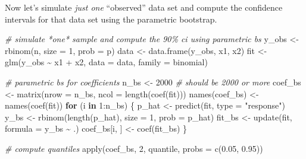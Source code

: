 \documentclass[
]{book}
\newenvironment{Shaded}{\begin{snugshade}}{\end{snugshade}}
\newcommand{\AttributeTok}[1]{\textcolor[rgb]{0.77,0.63,0.00}{#1}}
\newcommand{\CommentTok}[1]{\textcolor[rgb]{0.56,0.35,0.01}{\textit{#1}}}
\newcommand{\ControlFlowTok}[1]{\textcolor[rgb]{0.13,0.29,0.53}{\textbf{#1}}}
\newcommand{\DecValTok}[1]{\textcolor[rgb]{0.00,0.00,0.81}{#1}}
\newcommand{\FloatTok}[1]{\textcolor[rgb]{0.00,0.00,0.81}{#1}}
\newcommand{\FunctionTok}[1]{\textcolor[rgb]{0.00,0.00,0.00}{#1}}
\newcommand{\NormalTok}[1]{#1}
\newcommand{\OtherTok}[1]{\textcolor[rgb]{0.56,0.35,0.01}{#1}}
\newcommand{\SpecialCharTok}[1]{\textcolor[rgb]{0.00,0.00,0.00}{#1}}
\newcommand{\StringTok}[1]{\textcolor[rgb]{0.31,0.60,0.02}{#1}}
\begin{document}
Now let's simulate \emph{just one} ``observed'' data set and compute the confidence intervals for that data set using the parametric bootstrap.

\begin{Shaded}
\begin{Highlighting}[]
\CommentTok{\# simulate *one* sample and compute the 90\% ci using parametric bs}
\NormalTok{y\_obs }\OtherTok{\textless{}{-}} \FunctionTok{rbinom}\NormalTok{(n, }\AttributeTok{size =} \DecValTok{1}\NormalTok{, }\AttributeTok{prob =}\NormalTok{ p)}
\NormalTok{data }\OtherTok{\textless{}{-}} \FunctionTok{data.frame}\NormalTok{(y\_obs, x1, x2)}
\NormalTok{fit }\OtherTok{\textless{}{-}} \FunctionTok{glm}\NormalTok{(y\_obs }\SpecialCharTok{\textasciitilde{}}\NormalTok{ x1 }\SpecialCharTok{+}\NormalTok{ x2, }\AttributeTok{data =}\NormalTok{ data, }\AttributeTok{family =}\NormalTok{ binomial)}

\CommentTok{\# parametric bs for coefficients}
\NormalTok{n\_bs }\OtherTok{\textless{}{-}} \DecValTok{2000}  \CommentTok{\# should be 2000 or more}
\NormalTok{coef\_bs }\OtherTok{\textless{}{-}} \FunctionTok{matrix}\NormalTok{(}\AttributeTok{nrow =}\NormalTok{ n\_bs, }\AttributeTok{ncol =} \FunctionTok{length}\NormalTok{(}\FunctionTok{coef}\NormalTok{(fit)))}
\FunctionTok{names}\NormalTok{(coef\_bs) }\OtherTok{\textless{}{-}} \FunctionTok{names}\NormalTok{(}\FunctionTok{coef}\NormalTok{(fit))}
\ControlFlowTok{for}\NormalTok{ (i }\ControlFlowTok{in} \DecValTok{1}\SpecialCharTok{:}\NormalTok{n\_bs) \{}
\NormalTok{  p\_hat }\OtherTok{\textless{}{-}} \FunctionTok{predict}\NormalTok{(fit, }\AttributeTok{type =} \StringTok{"response"}\NormalTok{)}
\NormalTok{  y\_bs }\OtherTok{\textless{}{-}} \FunctionTok{rbinom}\NormalTok{(}\FunctionTok{length}\NormalTok{(p\_hat), }\AttributeTok{size =} \DecValTok{1}\NormalTok{, }\AttributeTok{prob =}\NormalTok{ p\_hat)}
\NormalTok{  fit\_bs }\OtherTok{\textless{}{-}} \FunctionTok{update}\NormalTok{(fit, }\AttributeTok{formula =}\NormalTok{ y\_bs }\SpecialCharTok{\textasciitilde{}}\NormalTok{ .)}
\NormalTok{  coef\_bs[i, ] }\OtherTok{\textless{}{-}} \FunctionTok{coef}\NormalTok{(fit\_bs)}
\NormalTok{\}}

\CommentTok{\# compute quantiles}
\FunctionTok{apply}\NormalTok{(coef\_bs, }\DecValTok{2}\NormalTok{, quantile, }\AttributeTok{probs =} \FunctionTok{c}\NormalTok{(}\FloatTok{0.05}\NormalTok{, }\FloatTok{0.95}\NormalTok{))}
\end{Highlighting}
\end{Shaded}
\end{document}
